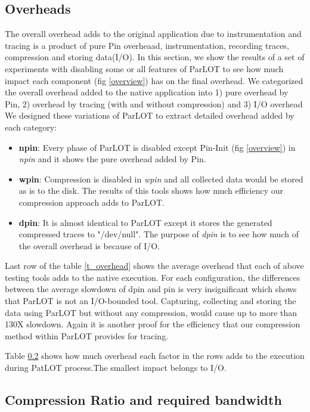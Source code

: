 \subsection{Overheads}
The overall overhead adds to the original application due to instrumentation and tracing is a product of pure Pin overheaad, instrumentation, recording traces, compression and storing data(I/O).
In this section, we show the results of a set of experiments with disabling some or all features of ParLOT to see how much impact each component (fig \ref{overview}) has on the final overhead.
We categorized the overall overhead added to the native application into 1) pure overhead by Pin, 2) overhead by tracing (with and without compression) and 3) I/O overhead\\
We designed these variations of ParLOT to extract detailed overhead added by each category:
\begin{itemize}
\item \textbf{npin}: Every phase of ParLOT is disabled except Pin-Init (fig \ref{overview}) in \textit{npin} and it shows the pure overhead added by Pin. 
\item \textbf{wpin}: Compression is disabled in \textit{wpin} and all collected data would be stored as is to the disk. The results of this tools shows how much efficiency our compression approach adds to ParLOT. 
\item \textbf{dpin}: It is almost identical to ParLOT except it stores the generated compressed traces to "/dev/null". The purpose of \textit{dpin} is to see how much of the overall overhead is because of I/O.
\end{itemize}

Last row of the table \ref{t_overhead} shows the average overhead that each of above testing tools adds to the native execution. For each configuration, the differences between the average slowdown of dpin and pin is very insignificant which shows that ParLOT is not an I/O-bounded tool. 
Capturing, collecting and storing the data using ParLOT but without any compression, would cause up to more than 130X slowdown. Again it is another proof for the efficiency that our compression method within ParLOT provides for tracing.

Table \ref{} shows how much overhead each factor in the rows adds to the execution during PatLOT process.The smallest impact belongs to I/O.

\subsection{Compression Ratio and required bandwidth}

